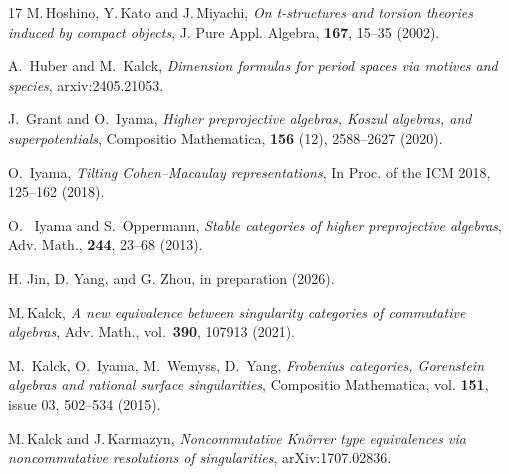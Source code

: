 \documentclass[a4paper,11pt, reqno]{amsart}
\theoremstyle{plain}
\theoremstyle{definition}
\numberwithin{equation}{section}
\begin{document}
\begin{thebibliography}{17}
M.\,Hoshino, Y.\,Kato and J.\,Miyachi, 
{\it  On t-structures and torsion theories induced by compact objects},  J. Pure Appl. Algebra, \textbf{167}, 15--35 (2002).

A.~Huber and M.~Kalck, {\it Dimension formulas for period spaces via motives and species}, 
arxiv:2405.21053.





 J.~Grant and O.~Iyama,   {\it Higher preprojective algebras, Koszul algebras, and superpotentials}, Compositio Mathematica, \textbf{156} (12), 2588--2627 (2020).

 O.~Iyama, {\it Tilting Cohen–Macaulay representations}, In Proc. of the ICM 2018, 125--162 (2018).

 O.~ Iyama and S.~Oppermann,
{\it Stable categories of higher preprojective algebras},
Adv. Math.,
{\bf 244},
23--68 (2013).

H. Jin,  D. Yang, and G. Zhou, in preparation (2026).




M.\,Kalck, 
{\it A new equivalence between singularity categories of commutative algebras}, 
  Adv. Math.,
vol.~\textbf{390}, 107913 (2021).

  M.~Kalck, O.~Iyama, M.~Wemyss, D.~Yang, \emph{Frobenius categories, Gorenstein algebras and rational surface singularities},   
 Compositio Mathematica, vol. \textbf{151}, issue 03, 502--534 (2015).

M.\,Kalck and J.\,Karmazyn, 
{\it Noncommutative Kn\"orrer type equivalences via noncommutative resolutions of singularities}, arXiv:1707.02836.



\end{thebibliography}
\end{document}
